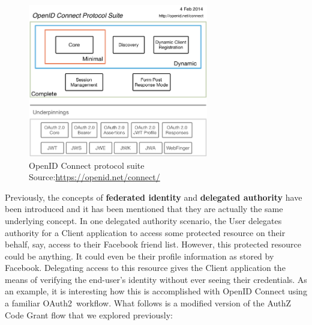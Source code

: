 \documentclass[a4paper,12pt]{article}
\def\oauth{OAuth2\xspace}
\begin{document}
\begin{figure}[ht]
    \centering
    \includegraphics[width=0.7\textwidth]{figures/OpenIDC-map.png}
    \caption[OpenID Connect protocol suite]{OpenID Connect protocol suite\\\hspace{\textwidth}Source:\hspace{0.2cm}\url{https://openid.net/connect/}}
    \label{fig:oidc}
\end{figure}

Previously, the concepts of \textbf{federated identity} and \textbf{delegated authority} have been introduced and it has been mentioned that they are actually the same underlying concept. In one delegated authority scenario, the User delegates authority for a Client application to access some protected resource on their behalf, say, access to their Facebook friend list. However, this protected resource could be anything. It could even be their profile information as stored by Facebook. Delegating access to this resource gives the Client application the means of verifying the end-user's identity without ever seeing their credentials. As an example, it is interesting how this is accomplished with OpenID Connect using a familiar \oauth\ workflow. What follows is a modified version of the AuthZ Code Grant flow that we explored previously:
\end{document}
